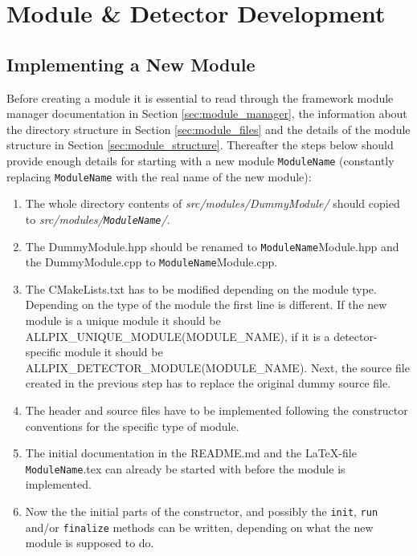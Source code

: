 \section{Module \& Detector Development}
\subsection{Implementing a New Module}
\label{sec:building_new_module}
Before creating a module it is essential to read through the framework module manager documentation in Section \ref{sec:module_manager}, the information about the directory structure in Section \ref{sec:module_files} and the details of the module structure in Section \ref{sec:module_structure}. Thereafter the steps below should provide enough details for starting with a new module \texttt{ModuleName} (constantly replacing  \texttt{ModuleName} with the real name of the new module):
\begin{enumerate}
\item The whole directory contents of \textit{src/modules/DummyModule/} should copied to \textit{src/modules/\texttt{ModuleName}/}.
\item The DummyModule.hpp should be renamed to \texttt{ModuleName}Module.hpp and the DummyModule.cpp to \texttt{ModuleName}Module.cpp.
\item The CMakeLists.txt has to be modified depending on the module type. Depending on the type of the module the first line is different. If the new module is a unique module it should be ALLPIX\_UNIQUE\_MODULE(MODULE\_NAME), if it is a detector-specific module it should be ALLPIX\_DETECTOR\_MODULE(MODULE\_NAME). Next, the source file created in the previous step has to replace the original dummy source file.
\item The header and source files have to be implemented following the constructor conventions for the specific type of module.
\item The initial documentation in the README.md and the \LaTeX-file \texttt{ModuleName}.tex can already be started with before the module is implemented.
\item Now the the initial parts of the constructor, and possibly the \texttt{init}, \texttt{run} and/or \texttt{finalize} methods can be written, depending on what the new module is supposed to do.
\end{enumerate}

